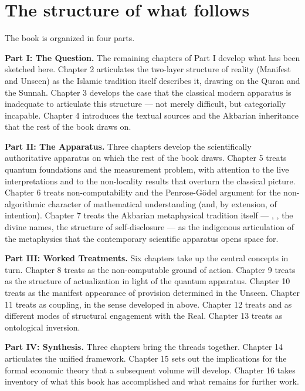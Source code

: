 \section{The structure of what follows}
\label{sec:structure-of-the-book}

The book is organized in four parts.

\textbf{Part I: The Question.} The remaining chapters of Part I develop
what has been sketched here. Chapter 2 articulates the two-layer
structure of reality (Manifest and Unseen) as the Islamic tradition
itself describes it, drawing on the Quran and the Sunnah. Chapter 3
develops the case that the classical modern apparatus is inadequate to
articulate this structure --- not merely difficult, but categorially
incapable. Chapter 4 introduces the textual sources and the Akbarian
inheritance that the rest of the book draws on.

\textbf{Part II: The Apparatus.} Three chapters develop the
scientifically authoritative apparatus on which the rest of the book
draws. Chapter 5 treats quantum foundations and the measurement
problem, with attention to the live interpretations and to the
non-locality results that overturn the classical picture. Chapter 6
treats non-computability and the Penrose-G\"odel argument for the
non-algorithmic character of mathematical understanding (and, by
extension, of intention). Chapter 7 treats the Akbarian metaphysical
tradition itself --- , , the divine names, the
structure of self-disclosure --- as the indigenous articulation of the
metaphysics that the contemporary scientific apparatus opens space for.

\textbf{Part III: Worked Treatments.} Six chapters take up the central
concepts in turn. Chapter 8 treats  as the non-computable
ground of action. Chapter 9 treats  as the structure of
actualization in light of the quantum apparatus. Chapter 10 treats
 as the manifest appearance of provision determined in the
Unseen. Chapter 11 treats  as coupling, in the sense
developed in  above. Chapter 12 treats
 and  as different modes of structural engagement
with the Real. Chapter 13 treats  as ontological inversion.

\textbf{Part IV: Synthesis.} Three chapters bring the threads together.
Chapter 14 articulates the unified framework. Chapter 15 sets out the
implications for the formal economic theory that a subsequent volume
will develop. Chapter 16 takes inventory of what this book has
accomplished and what remains for further work.

